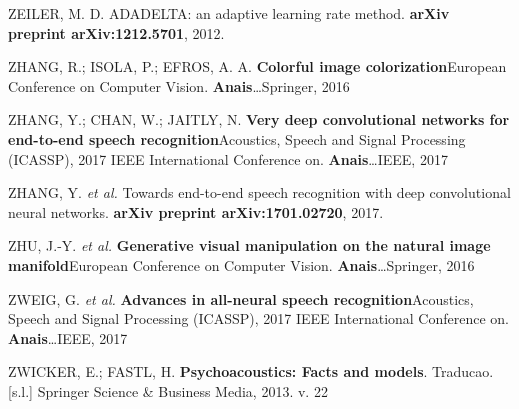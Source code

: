 \documentclass[]{article}
\begin{document}
\leavevmode\hypertarget{ref-zeiler2012adadelta}{}%
ZEILER, M. D. ADADELTA: an adaptive learning rate method. \textbf{arXiv
preprint arXiv:1212.5701}, 2012.

\leavevmode\hypertarget{ref-zhang2016colorful}{}%
ZHANG, R.; ISOLA, P.; EFROS, A. A. \textbf{Colorful image
colorization}European Conference on Computer Vision.
\textbf{Anais}\ldots{}Springer, 2016

\leavevmode\hypertarget{ref-zhang2017very}{}%
ZHANG, Y.; CHAN, W.; JAITLY, N. \textbf{Very deep convolutional networks
for end-to-end speech recognition}Acoustics, Speech and Signal
Processing (ICASSP), 2017 IEEE International Conference on.
\textbf{Anais}\ldots{}IEEE, 2017

\leavevmode\hypertarget{ref-zhang2017towards}{}%
ZHANG, Y. \emph{et al.} Towards end-to-end speech recognition with deep
convolutional neural networks. \textbf{arXiv preprint arXiv:1701.02720},
2017.

\leavevmode\hypertarget{ref-zhu2016generative}{}%
ZHU, J.-Y. \emph{et al.} \textbf{Generative visual manipulation on the
natural image manifold}European Conference on Computer Vision.
\textbf{Anais}\ldots{}Springer, 2016

\leavevmode\hypertarget{ref-zweig2017advances}{}%
ZWEIG, G. \emph{et al.} \textbf{Advances in all-neural speech
recognition}Acoustics, Speech and Signal Processing (ICASSP), 2017 IEEE
International Conference on. \textbf{Anais}\ldots{}IEEE, 2017

\leavevmode\hypertarget{ref-zwicker2013psychoacoustics}{}%
ZWICKER, E.; FASTL, H. \textbf{Psychoacoustics: Facts and models}.
Traducao. {[}s.l.{]} Springer Science \& Business Media, 2013. v. 22
\end{document}
